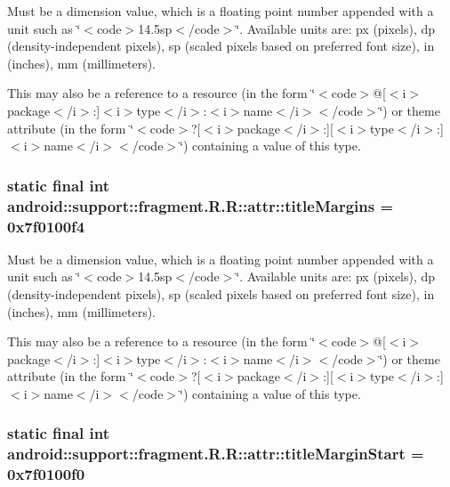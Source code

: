 Must be a dimension value, which is a floating point number appended with a unit such as \char`\"{}$<$code$>$14.5sp$<$/code$>$\char`\"{}. Available units are: px (pixels), dp (density-independent pixels), sp (scaled pixels based on preferred font size), in (inches), mm (millimeters). 

This may also be a reference to a resource (in the form \char`\"{}$<$code$>$@\mbox{[}$<$i$>$package$<$/i$>$:\mbox{]}$<$i$>$type$<$/i$>$:$<$i$>$name$<$/i$>$$<$/code$>$\char`\"{}) or theme attribute (in the form \char`\"{}$<$code$>$?\mbox{[}$<$i$>$package$<$/i$>$:\mbox{]}\mbox{[}$<$i$>$type$<$/i$>$:\mbox{]}$<$i$>$name$<$/i$>$$<$/code$>$\char`\"{}) containing a value of this type. \hypertarget{classandroid_1_1support_1_1fragment_1_1_r_1_1attr_495838ac431ccdeb0dce2a98cac982c1}{
\subsubsection[{titleMargins}]{\setlength{\rightskip}{0pt plus 5cm}static final int android::support::fragment.R.R::attr::titleMargins = 0x7f0100f4}}
\label{classandroid_1_1support_1_1fragment_1_1_r_1_1attr_495838ac431ccdeb0dce2a98cac982c1}


Must be a dimension value, which is a floating point number appended with a unit such as \char`\"{}$<$code$>$14.5sp$<$/code$>$\char`\"{}. Available units are: px (pixels), dp (density-independent pixels), sp (scaled pixels based on preferred font size), in (inches), mm (millimeters). 

This may also be a reference to a resource (in the form \char`\"{}$<$code$>$@\mbox{[}$<$i$>$package$<$/i$>$:\mbox{]}$<$i$>$type$<$/i$>$:$<$i$>$name$<$/i$>$$<$/code$>$\char`\"{}) or theme attribute (in the form \char`\"{}$<$code$>$?\mbox{[}$<$i$>$package$<$/i$>$:\mbox{]}\mbox{[}$<$i$>$type$<$/i$>$:\mbox{]}$<$i$>$name$<$/i$>$$<$/code$>$\char`\"{}) containing a value of this type. \hypertarget{classandroid_1_1support_1_1fragment_1_1_r_1_1attr_6d6fabb1565d093b11bfe1d14f845633}{
\subsubsection[{titleMarginStart}]{\setlength{\rightskip}{0pt plus 5cm}static final int android::support::fragment.R.R::attr::titleMarginStart = 0x7f0100f0}}
\label{classandroid_1_1support_1_1fragment_1_1_r_1_1attr_6d6fabb1565d093b11bfe1d14f845633}


